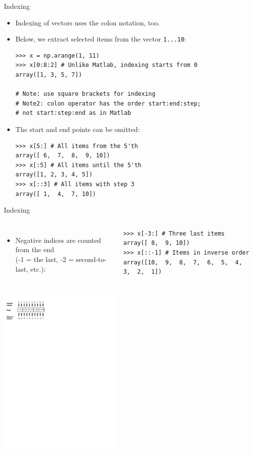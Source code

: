 \documentclass[10pt, aspectratio=169]{beamer} %
\begin{document}
\begin{frame}[fragile]
 {Indexing}
\begin{itemize}
\item Indexing of vectors uses the colon notation, too.
\item Below, we extract selected items from the vector \verb+1...10+:
\begin{lstlisting}
>>> x = np.arange(1, 11)
>>> x[0:8:2] # Unlike Matlab, indexing starts from 0
array([1, 3, 5, 7])

# Note: use square brackets for indexing
# Note2: colon operator has the order start:end:step;
# not start:step:end as in Matlab
\end{lstlisting}
\item The start and end points can be omitted:
\begin{lstlisting}
>>> x[5:] # All items from the 5'th
array([ 6,  7,  8,  9, 10])
>>> x[:5] # All items until the 5'th
array([1, 2, 3, 4, 5])
>>> x[::3] # All items with step 3
array([ 1,  4,  7, 10])
\end{lstlisting}
\end{itemize}
\end{frame}

\begin{frame}[fragile,allowframebreaks=0.8]
 {Indexing}
\begin{columns}
\begin{itemize}
\item Negative indices are counted from the end\\ (-1 = the last, -2 = second-to-last, etc.):
\end{itemize}
\begin{lstlisting}
>>> x[-3:] # Three last items
array([ 8,  9, 10])
>>> x[::-1] # Items in inverse order
array([10,  9,  8,  7,  6,  5,  4,  3,  2,  1])
\end{lstlisting}
\end{columns}
\centerline{\includegraphics[width=0.45\textwidth]{Indexing.pdf}}
\end{frame}
\end{document}
